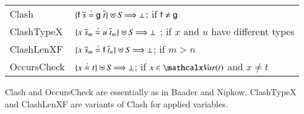 

%

\noindent
\begin{tabular}{ll}
  \textsf{Clash} &   $\{ \cst{f} \; \overline{s} \unif \cst{g} \; \overline{t} \} \uplus \mathit{S} \Unifarrow \bot$; if $\mathsf{f} \not= \mathsf{g}$ \\[\jot]
  \textsf{ClashTypeX} & $\{ x \; \tuple{s}{m} \unif u \; \tuple{t}{m} \} \allowbreak \uplus \mathit{S} \Unifarrow \bot$ ; if $x$ and $u$ have different types \\[\jot]
  \textsf{ClashLenXF} & $\{ x \; \tuple{s}{m} \unif \cst{f} \; \tuple{t}{n} \} \allowbreak \uplus \mathit{S} \Unifarrow \bot$; if $m > n$ \\[\jot]
  \textsf{OccursCheck}     & $\{ x \unif t \} \uplus \mathit{S} \Unifarrow \bot$;  if $x \in \Var(t)$ and $x \not= t$
\end{tabular}

\begin{rep}\textsf{Clash} and \textsf{OccursCheck} are essentially as in
Baader and Nipkow. \textsf{ClashTypeX} and \textsf{ClashLenXF}
are variants of \textsf{Clash} for applied variables.\end{rep}

\newcommand\unifARROW[1]{\rlap{\ensuremath{\Unifarrow_{#1}\;}}\phantom{\Unifarrow_\textsf{DecomposeX}\;}}

